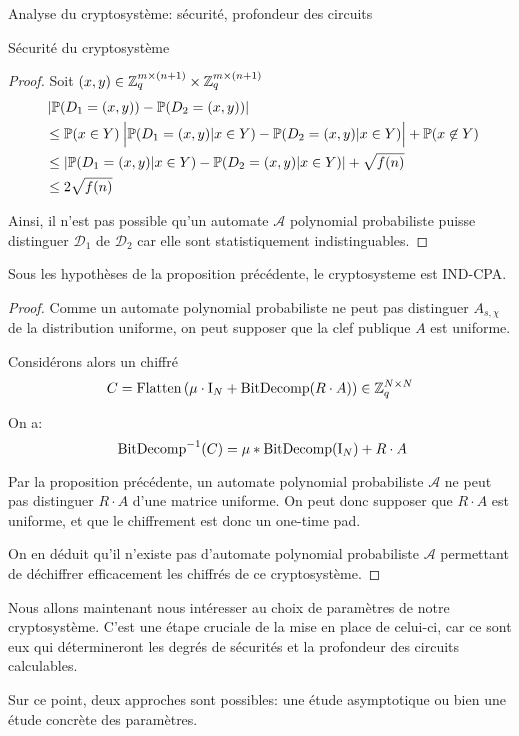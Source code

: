 \begin{section}{Analyse du cryptosystème: sécurité, profondeur des circuits}
\begin{subsection}{Sécurité du cryptosystème}
\begin{proof}
	
	Soit $(x,y)\in \mathbb{Z}_q^{m \times (n+1)} \times \mathbb{Z}_q^{m \times (n+1)}$
	\begin{align*}
	&\left|\PP(D_1 = (x,y)) - \PP(D_2 = (x,y))\right| \\ &\leq \PP(x\in Y)\:
	\Big|\PP(D_1 
	= (x,y)| x\in Y) - \PP(D_2 = (x,y)|x\in Y)\Big| + \PP(x \not\in Y)  \\
	&\leq |\PP(D_1 = (x,y) | x \in Y) - \PP(D_2 = (x,y)|x \in Y)| + \sqrt{f(n)} \\
	&\leq 2\sqrt{f(n)} 
	\end{align*}
	
	Ainsi, il n'est pas possible qu'un automate $\mathcal{A}$
	polynomial probabiliste puisse distinguer 
	$\mathcal{D}_1$ de $\mathcal{D}_2$ car elle sont statistiquement 
	indistinguables.
	\end{proof}
	\begin{thm}
	\label{ind_cpa}
	Sous les hypothèses de la proposition précédente, le
	cryptosysteme est IND-CPA.
	\end{thm}
	\begin{proof}
	Comme un automate polynomial probabiliste ne peut pas distinguer
	$A_{s, \chi}$ de la distribution uniforme, on peut supposer que la
	clef publique $A$ est uniforme.

	Considérons alors un chiffré 
	\[C = \text{Flatten}\left(\mu \cdot \text{I}_N + \text{BitDecomp}(R\cdot A)\right) \in
	\mathbb{Z}_q^{N\times N}\]

	On a:
	\[ \bitdecomp^{-1}(C) = \mu * \bitdecomp(\id_N) + R\cdot A\]

	Par la proposition précédente, un automate polynomial probabiliste $\mathcal{A}$
	ne peut pas distinguer $R\cdot A$ d'une matrice uniforme. On peut donc
	supposer que $R\cdot A$ est uniforme, et que le chiffrement est donc
	un one-time pad.

	On en déduit qu'il n'existe pas d'automate polynomial probabiliste
	$\mathcal{A}$ permettant de déchiffrer efficacement les chiffrés de ce cryptosystème.
	\end{proof}
	
	\end{subsection}

	Nous allons maintenant nous intéresser au choix de paramètres de notre
	cryptosystème. C'est une étape cruciale de la mise en place de celui-ci,
	car ce sont eux qui détermineront les degrés de sécurités et la profondeur des circuits calculables.
	
	Sur ce point, deux approches sont possibles: une étude asymptotique ou
	bien une étude \og concrète \fg des paramètres.


\end{section}
